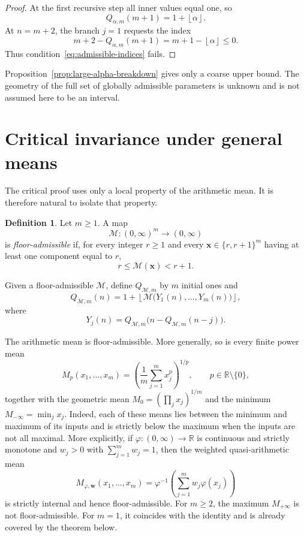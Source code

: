 \documentclass[11pt]{article}
\theoremstyle{definition}
\newtheorem{definition}[theorem]{Definition}
\theoremstyle{remark}
\newcommand{\floor}[1]{\left\lfloor #1\right\rfloor}
\newcommand{\R}{\mathbb{R}}
\begin{document}
\begin{proof}
At the first recursive step all inner values equal one, so
\[
Q_{\alpha,m}(m+1)=1+\floor{\alpha}.
\]
At $n=m+2$, the branch $j=1$ requests the index
\[
m+2-Q_{\alpha,m}(m+1)
=m+1-\floor{\alpha}\le0.
\]
Thus condition~\eqref{eq:admissible-indices} fails.
\end{proof}

Proposition~\ref{prop:large-alpha-breakdown} gives only a coarse upper
bound.  The geometry of the full set of globally admissible parameters is
unknown and is not assumed here to be an interval.

\section{Critical invariance under general means}\label{sec:critical}

The critical proof uses only a local property of the arithmetic mean.  It is
therefore natural to isolate that property.

\begin{definition}\label{def:floor-admissible}
Let $m\ge1$.  A map
\[
\mathcal{M}:(0,\infty)^m\longrightarrow(0,\infty)
\]
is \emph{floor-admissible} if, for every integer $r\ge1$ and every
$\bm{x}\in\{r,r+1\}^m$ having at least one component equal to $r$,
\begin{equation}\label{eq:floor-lock}
r\le \mathcal{M}(\bm{x})<r+1.
\end{equation}
\end{definition}

Given a floor-admissible $\mathcal{M}$, define $Q_{\mathcal{M},m}$ by $m$
initial ones and
\begin{equation}\label{eq:aggregator-recursion}
Q_{\mathcal{M},m}(n)
=
1+\floor{
\mathcal{M}\bigl(Y_1(n),\ldots,Y_m(n)\bigr)
},
\end{equation}
where
\begin{equation}\label{eq:branches}
Y_j(n)
=
Q_{\mathcal{M},m}\bigl(n-Q_{\mathcal{M},m}(n-j)\bigr).
\end{equation}

The arithmetic mean is floor-admissible.  More generally, so is every finite
power mean
\[
M_p(x_1,\ldots,x_m)
=
\left(\frac1m\sum_{j=1}^{m}x_j^p\right)^{1/p},
\qquad p\in\R\setminus\{0\},
\]
together with the geometric mean $M_0=(\prod_jx_j)^{1/m}$ and the minimum
$M_{-\infty}=\min_jx_j$.  Indeed, each of these means lies between the
minimum and maximum of its inputs and is strictly below the maximum when the
inputs are not all maximal.  More explicitly, if
$\varphi:(0,\infty)\to\mathbb{R}$ is continuous and strictly monotone and
$w_j>0$ with $\sum_{j=1}^m w_j=1$, then the weighted quasi-arithmetic mean
\[
M_{\varphi,\bm w}(x_1,\ldots,x_m)
=
\varphi^{-1}\!\left(\sum_{j=1}^m w_j\varphi(x_j)\right)
\]
is strictly internal and hence floor-admissible.  For $m\ge2$, the maximum
$M_{+\infty}$ is not floor-admissible.  For $m=1$, it coincides with the
identity and is already covered by the theorem below.
\end{document}
